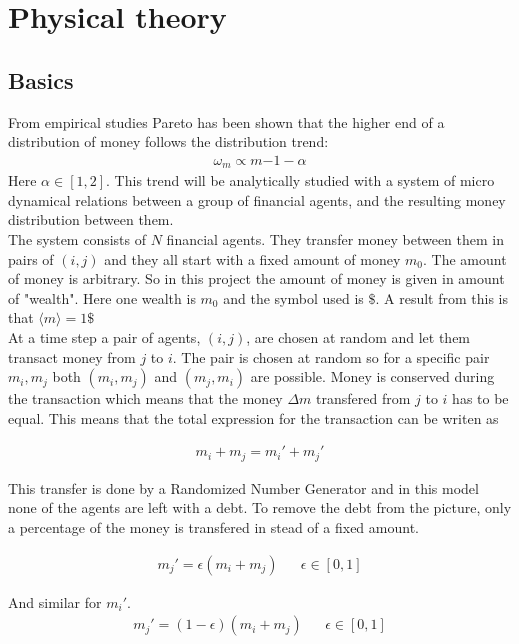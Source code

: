 \section{Physical theory}
\subsection{Basics}\label{sec:basics}

 From empirical studies Pareto has been shown that the higher end of a distribution of money follows the distribution trend\cite{paretoslaw}:
 \begin{align}
 	\omega_m\propto m{-1-\alpha}\label{eq:pareto}
 \end{align} 
Here $\alpha\in[1,2]$. This trend will be analytically studied with a system of micro dynamical relations between a group of financial agents, and the resulting money distribution between them. \\


The system consists of $N$ financial agents. They transfer money between them in pairs of $(i,j)$ and they all start with a fixed amount of money $m_0$. The amount of money is arbitrary. So in this project the amount of money is given in amount of "wealth". Here one wealth is $m_0$ and the symbol used is $\$$. A result from this is that $\langle m\rangle=1\$ $\\

At a time step a pair of agents, $(i,j)$, are chosen at random and let them transact money from $j$ to $i$. The pair is chosen at random so for a specific pair $m_i,m_j$ both $(m_i,m_j)$ and $(m_j,m_i)$ are possible. Money is conserved during the transaction which means that the money $\Delta m$ transfered from $j$ to $i$ has to be equal. This means that the total expression for the transaction can be writen as

\begin{align}
	m_i+m_j=m_i'+m_j'\label{eq:pengerbevart}
\end{align}

This transfer is done by a Randomized Number Generator and in this model none of the agents are left with a debt. To remove the debt from the picture, only a percentage of the money is transfered in stead of a fixed amount.

\begin{align}
	m_j'=\epsilon(m_i+m_j)&&\epsilon\in[0,1]\label{epsiloncrit}
\end{align}

And similar for $m_i'$.
\begin{align*}
	m_j'=(1-\epsilon)(m_i+m_j)&&\epsilon\in[0,1]
\end{align*}


